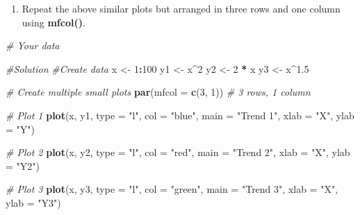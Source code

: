 \documentclass[
]{book}
\newenvironment{Shaded}{\begin{snugshade}}{\end{snugshade}}
\newcommand{\AttributeTok}[1]{\textcolor[rgb]{0.13,0.29,0.53}{#1}}
\newcommand{\CommentTok}[1]{\textcolor[rgb]{0.56,0.35,0.01}{\textit{#1}}}
\newcommand{\DecValTok}[1]{\textcolor[rgb]{0.00,0.00,0.81}{#1}}
\newcommand{\FloatTok}[1]{\textcolor[rgb]{0.00,0.00,0.81}{#1}}
\newcommand{\FunctionTok}[1]{\textcolor[rgb]{0.13,0.29,0.53}{\textbf{#1}}}
\newcommand{\NormalTok}[1]{#1}
\newcommand{\OtherTok}[1]{\textcolor[rgb]{0.56,0.35,0.01}{#1}}
\newcommand{\SpecialCharTok}[1]{\textcolor[rgb]{0.81,0.36,0.00}{\textbf{#1}}}
\newcommand{\StringTok}[1]{\textcolor[rgb]{0.31,0.60,0.02}{#1}}
\providecommand{\tightlist}{%
  \setlength{\itemsep}{0pt}\setlength{\parskip}{0pt}}
\begin{document}
\begin{enumerate}
\def\labelenumi{\roman{enumi})}
\setcounter{enumi}{3}
\tightlist
\item
  Repeat the above similar plots but arranged in three rows and one column using \textbf{mfcol()}.
\end{enumerate}

\begin{Shaded}
\begin{Highlighting}[]
\CommentTok{\# Your  data}

\CommentTok{\#Solution}
\CommentTok{\#Create data}
\NormalTok{x }\OtherTok{\textless{}{-}} \DecValTok{1}\SpecialCharTok{:}\DecValTok{100}
\NormalTok{y1 }\OtherTok{\textless{}{-}}\NormalTok{ x}\SpecialCharTok{\^{}}\DecValTok{2}
\NormalTok{y2 }\OtherTok{\textless{}{-}} \DecValTok{2} \SpecialCharTok{*}\NormalTok{ x}
\NormalTok{y3 }\OtherTok{\textless{}{-}}\NormalTok{ x}\SpecialCharTok{\^{}}\FloatTok{1.5}

\CommentTok{\# Create multiple small plots}
\FunctionTok{par}\NormalTok{(}\AttributeTok{mfcol =} \FunctionTok{c}\NormalTok{(}\DecValTok{3}\NormalTok{, }\DecValTok{1}\NormalTok{)) }\CommentTok{\# 3 rows, 1 column}

\CommentTok{\# Plot 1}
\FunctionTok{plot}\NormalTok{(x, y1, }\AttributeTok{type =} \StringTok{"l"}\NormalTok{, }\AttributeTok{col =} \StringTok{"blue"}\NormalTok{, }\AttributeTok{main =} \StringTok{"Trend 1"}\NormalTok{, }\AttributeTok{xlab =} \StringTok{"X"}\NormalTok{, }\AttributeTok{ylab =} \StringTok{"Y"}\NormalTok{)}

\CommentTok{\# Plot 2}
\FunctionTok{plot}\NormalTok{(x, y2, }\AttributeTok{type =} \StringTok{"l"}\NormalTok{, }\AttributeTok{col =} \StringTok{"red"}\NormalTok{, }\AttributeTok{main =} \StringTok{"Trend 2"}\NormalTok{, }\AttributeTok{xlab =} \StringTok{"X"}\NormalTok{, }\AttributeTok{ylab =} \StringTok{"Y2"}\NormalTok{)}

\CommentTok{\# Plot 3}
\FunctionTok{plot}\NormalTok{(x, y3, }\AttributeTok{type =} \StringTok{"l"}\NormalTok{, }\AttributeTok{col =} \StringTok{"green"}\NormalTok{, }\AttributeTok{main =} \StringTok{"Trend 3"}\NormalTok{, }\AttributeTok{xlab =} \StringTok{"X"}\NormalTok{, }\AttributeTok{ylab =} \StringTok{"Y3"}\NormalTok{)}
\end{Highlighting}
\end{Shaded}
\end{document}
